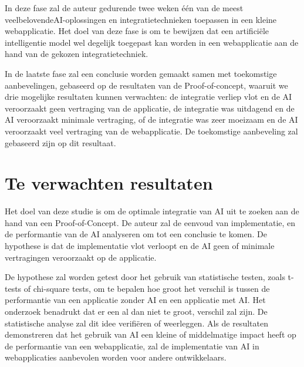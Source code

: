 \documentclass[dutch]{hogent-article}
\begin{document}
In deze fase zal de auteur gedurende twee weken één van de meest veelbelovende\linebreak AI-oplossingen en integratietechnieken toepassen in een kleine webapplicatie. Het doel van deze fase is om te bewijzen dat een artificiële intelligentie model wel degelijk toegepast kan worden in een webapplicatie aan de hand van de gekozen integratietechniek.

In de laatste fase zal een conclusie worden gemaakt samen met toekomstige aanbevelingen, gebaseerd op de resultaten van de Proof-of-conc\-ept, waaruit we drie mogelijke resultaten kunnen verwachten: de integratie verliep vlot en de AI veroorzaakt geen vertraging van de applicatie, de integratie was uitdagend en de AI veroorzaakt minimale vertraging, of de integratie was zeer moeizaam en de AI veroorzaakt veel vertraging van de webapplicatie. De toekomstige aanbeveling zal gebaseerd zijn op dit resultaat.

\section{Te verwachten resultaten}%
\label{sec:expected-results}


Het doel van deze studie is om de optimale integratie van AI uit te zoeken aan de hand van een Proof-of-Concept. De auteur zal de eenvoud van implementatie, en de performantie van de AI analyseren om tot een conclusie te komen. De hypothese is dat de implementatie vlot verloopt en de AI geen of minimale vertragingen veroorzaakt op de applicatie.

De hypothese zal worden getest door het gebruik van statistische testen, zoals t-tests of chi-square tests, om te bepalen hoe groot het verschil is tussen de performantie van een applicatie zonder AI en een applicatie met AI. Het onderzoek benadrukt dat er een al dan niet te groot, verschil zal zijn. De statistische analyse zal dit idee verifiëren of weerleggen. Als de resultaten demonstreren dat het gebruik van AI een kleine of middelmatige impact heeft op de performantie van een webapplicatie, zal de implementatie van AI in webapplicaties aanbevolen worden voor andere ontwikkelaars.
\end{document}
